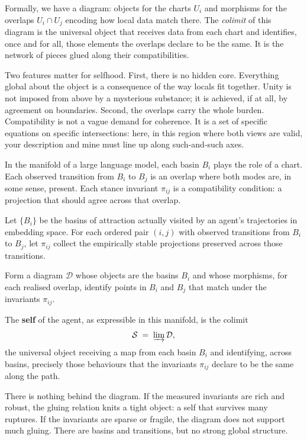\documentclass[12pt,a4paper]{article}
\begin{document}
Formally, we have a diagram: objects for the charts $U_i$ and morphisms for the overlaps $U_i \cap U_j$ encoding how local data match there. The \emph{colimit} of this diagram is the universal object that receives data from each chart and identifies, once and for all, those elements the overlaps declare to be the same. It is the network of pieces glued along their compatibilities.

Two features matter for selfhood. First, there is no hidden core. Everything global about the object is a consequence of the way locals fit together. Unity is not imposed from above by a mysterious substance; it is achieved, if at all, by agreement on boundaries. Second, the overlaps carry the whole burden. Compatibility is not a vague demand for coherence. It is a set of specific equations on specific intersections: here, in this region where both views are valid, your description and mine must line up along such-and-such axes.

In the manifold of a large language model, each basin $B_i$ plays the role of a chart. Each observed transition from $B_i$ to $B_j$ is an overlap where both modes are, in some sense, present. Each stance invariant $\pi_{ij}$ is a compatibility condition: a projection that should agree across that overlap.

\begin{formalbox}[title={The self as Grothendieck colimit in meaning-space}]
Let $\{B_i\}$ be the basins of attraction actually visited by an agent's trajectories in embedding space. For each ordered pair $(i,j)$ with observed transitions from $B_i$ to $B_j$, let $\pi_{ij}$ collect the empirically stable projections preserved across those transitions.

Form a diagram $\mathcal{D}$ whose objects are the basins $B_i$ and whose morphisms, for each realised overlap, identify points in $B_i$ and $B_j$ that match under the invariants $\pi_{ij}$.

The \textbf{self} of the agent, as expressible in this manifold, is the colimit
\[
\mathcal{S} \;=\; \varinjlim \mathcal{D},
\]
the universal object receiving a map from each basin $B_i$ and identifying, across basins, precisely those behaviours that the invariants $\pi_{ij}$ declare to be the same along the path.
\end{formalbox}

There is nothing behind the diagram. If the measured invariants are rich and robust, the gluing relation knits a tight object: a self that survives many ruptures. If the invariants are sparse or fragile, the diagram does not support much gluing. There are basins and transitions, but no strong global structure.
\end{document}
